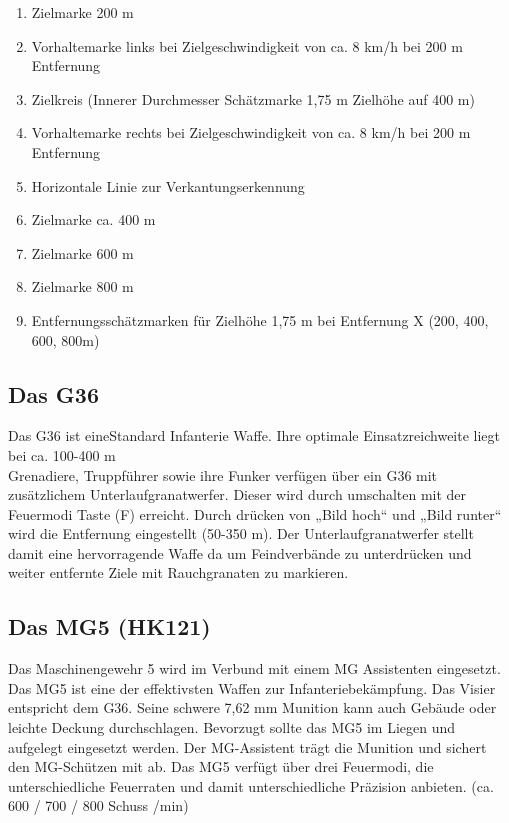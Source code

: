 \begin{enumerate}
\item Zielmarke 200 m
\item Vorhaltemarke links bei Zielgeschwindigkeit von ca. 8 km/h bei 200 m Entfernung
\item Zielkreis (Innerer Durchmesser Schätzmarke 1,75 m Zielhöhe auf 400 m)
\item Vorhaltemarke rechts bei Zielgeschwindigkeit von ca. 8 km/h bei 200 m Entfernung
\item Horizontale Linie zur Verkantungserkennung
\item Zielmarke ca. 400 m
\item Zielmarke 600 m
\item Zielmarke 800 m
\item Entfernungsschätzmarken für Zielhöhe 1,75 m bei Entfernung X (200, 400, 600, 800m)
\end{enumerate}

\subsection{Das G36}
Das G36 ist eineStandard Infanterie Waffe. Ihre optimale Einsatzreichweite liegt bei ca. 100-400 m \\
Grenadiere, Truppführer sowie ihre Funker verfügen über ein G36 mit zusätzlichem Unterlaufgranatwerfer. Dieser wird durch umschalten mit der Feuermodi Taste (F) erreicht. Durch drücken von „Bild hoch“ und „Bild runter“ wird die Entfernung eingestellt (50-350 m). Der Unterlaufgranatwerfer stellt damit eine hervorragende Waffe da um Feindverbände zu unterdrücken und weiter entfernte Ziele mit Rauchgranaten zu markieren. \\

\subsection{Das MG5 (HK121)}
Das Maschinengewehr 5 wird im Verbund mit einem MG Assistenten eingesetzt. Das MG5 ist eine der effektivsten Waffen zur Infanteriebekämpfung. Das Visier entspricht dem G36. Seine schwere 7,62 mm Munition kann auch Gebäude oder leichte Deckung durchschlagen. Bevorzugt sollte das MG5 im Liegen und aufgelegt eingesetzt werden. Der MG-Assistent trägt die Munition und sichert den MG-Schützen mit ab. Das MG5 verfügt über drei Feuermodi, die unterschiedliche Feuerraten und damit unterschiedliche Präzision anbieten.  (ca. 600  / 700 / 800 Schuss /min) \\

